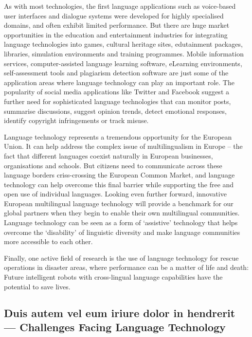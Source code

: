 \documentclass[]{../metanetpaper}
\begin{document}
\begin{Parallel}[c]{80mm}{80mm}
{    As with most technologies, the first language applications such as voice-based user interfaces and dialogue systems were developed for highly specialised domains, and often exhibit limited performance. But there are huge market opportunities in the education and entertainment industries for integrating language technologies into games, cultural heritage sites, edutainment packages, libraries, simulation environments and training programmes. Mobile information services, computer-assisted language learning software, eLearning environments, self-assessment tools and plagiarism detection software are just some of the application areas where language technology can play an important role. The popularity of social media applications like Twitter and Facebook suggest a further need for sophisticated language technologies that can monitor posts, summarise discussions, suggest opinion trends, detect emotional responses, identify copyright infringements or track misuse.

    Language technology represents a tremendous opportunity for the European Union. It can help address the complex issue of multilingualism in Europe – the fact that different languages coexist naturally in European businesses, organisations and schools. But citizens need to communicate across these language borders criss-crossing the European Common Market, and language technology can help overcome this final barrier while supporting the free and open use of individual languages. Looking even further forward, innovative European multilingual language technology will provide a benchmark for our global partners when they begin to enable their own multilingual communities. Language technology can be seen as a form of ‘assistive’ technology that helps overcome the ‘disability’ of linguistic diversity and make language communities more accessible to each other.

    Finally, one active field of research is the use of language technology for rescue operations in disaster areas, where performance can be a matter of life and death: Future intelligent robots with cross-lingual language capabilities have the potential to save lives.
  }
  
  \ParallelPar


  \subsection{Duis autem vel eum iriure dolor in hendrerit --- Challenges Facing Language Technology }


\end{Parallel}
\end{document}
